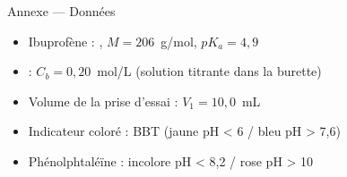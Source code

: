 \documentclass[11pt,a4paper]{article}
\newcommand{\sectitle}[1]{%
  \vspace{6pt}
  \noindent\colorbox{exoheader}{\parbox{\dimexpr\linewidth-2\fboxsep}%
    {\color{white}\bfseries\large\strut\quad #1}}
  \vspace{4pt}
}
\begin{document}
\sectitle{Annexe --- Données}

\begin{mdframed}[backgroundcolor=exolight, linecolor=exoheader, linewidth=1.2pt]
\begin{itemize}
  \item Ibuprofène : , $M = 206$~g/mol, $pK_a = 4{,}9$
  \item {} : $C_b = 0{,}20$~mol/L (solution titrante dans la burette)
  \item Volume de la prise d'essai : $V_1 = 10{,}0$~mL
  \item Indicateur coloré : BBT (jaune pH < 6 / bleu pH > 7,6)
  \item Phénolphtaléïne : incolore pH < 8,2 / rose pH > 10
\end{itemize}
\end{mdframed}
\end{document}

